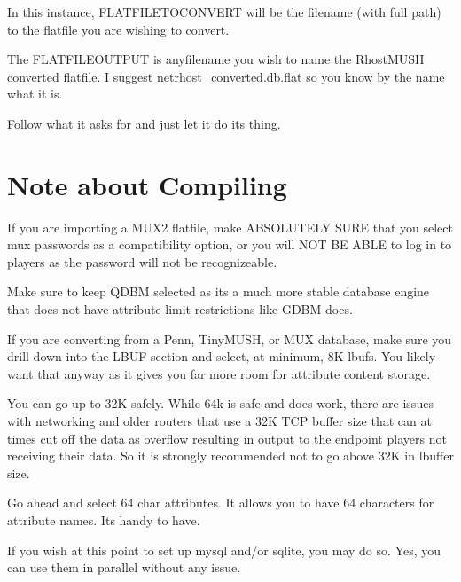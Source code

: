 \documentclass[letterpaper,10pt,english]{sphinxmanual}
\begin{document}
\begin{sphinxVerbatim}[commandchars=\\\{\}]
  
\end{sphinxVerbatim}

\sphinxAtStartPar
In this instance, FLATFILETOCONVERT will be the filename (with full path) to
the flatfile you are wishing to convert.

\sphinxAtStartPar
The FLATFILEOUTPUT is anyfilename you wish to name the RhostMUSH converted
flatfile.  I suggest netrhost\_converted.db.flat so you know by the name
what it is.

\sphinxAtStartPar
Follow what it asks for and just let it do its thing.


\section{Note about Compiling}
\label{\detokenize{database:note-about-compiling}}
\sphinxAtStartPar
If you are importing a MUX2 flatfile, make ABSOLUTELY SURE that you select
mux passwords as a compatibility option, or you will NOT BE ABLE to log in
to players as the password will not be recognizeable.

\sphinxAtStartPar
Make sure to keep QDBM selected as it\textquotesingle{}s a much more stable database engine
that does not have attribute limit restrictions like GDBM does.

\sphinxAtStartPar
If you are converting from a Penn, TinyMUSH, or MUX database, make sure you
drill down into the LBUF section and select, at minimum, 8K lbufs.  You likely
want that anyway as it gives you far more room for attribute content storage.

\sphinxAtStartPar
You can go up to 32K safely.  While 64k is safe and does work, there are issues
with networking and older routers that use a 32K TCP buffer size that can
at times cut off the data as overflow resulting in output to the end\sphinxhyphen{}point
players not receiving their data.  So it is strongly recommended not to go
above 32K in lbuffer size.

\sphinxAtStartPar
Go ahead and select 64 char attributes.  It allows you to have 64 characters
for attribute names.  It\textquotesingle{}s handy to have.

\sphinxAtStartPar
If you wish at this point to set up mysql and/or sqlite, you  may do so.
Yes, you can use them in parallel without any issue.
\end{document}
